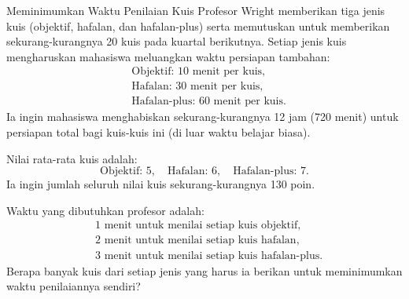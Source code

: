\begin{ex}{Meminimumkan Waktu Penilaian Kuis}{}
 Profesor Wright memberikan tiga jenis kuis (objektif, hafalan, dan hafalan-plus) serta memutuskan untuk memberikan sekurang-kurangnya 20 kuis pada kuartal berikutnya. Setiap jenis kuis mengharuskan mahasiswa meluangkan waktu persiapan tambahan:
\[
\begin{aligned}
&\text{Objektif: } 10 \text{ menit per kuis},\\
&\text{Hafalan: } 30 \text{ menit per kuis},\\
&\text{Hafalan-plus: } 60 \text{ menit per kuis}.
\end{aligned}
\]
Ia ingin mahasiswa menghabiskan sekurang-kurangnya 12 jam (720 menit) untuk persiapan total bagi kuis-kuis ini (di luar waktu belajar biasa).

Nilai rata-rata kuis adalah:
\[
\text{Objektif: } 5,\quad
\text{Hafalan: } 6,\quad
\text{Hafalan-plus: } 7.
\]
Ia ingin jumlah seluruh nilai kuis sekurang-kurangnya 130 poin.

Waktu yang dibutuhkan profesor adalah:
\[
\begin{aligned}
& 1 \text{ menit untuk menilai setiap kuis objektif},\\
& 2 \text{ menit untuk menilai setiap kuis hafalan},\\
& 3 \text{ menit untuk menilai setiap kuis hafalan-plus}.
\end{aligned}
\]
Berapa banyak kuis dari setiap jenis yang harus ia berikan untuk meminimumkan waktu penilaiannya sendiri?
\end{ex}

